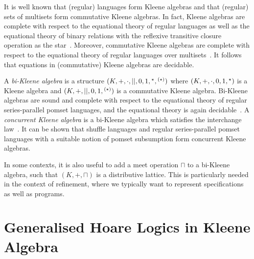 \documentclass{llncs}
\begin{document}
It is well known that (regular) languages form Kleene algebras and
that (regular) sets of multisets form commutative Kleene algebras. In
fact, Kleene algebras are complete with respect to the equational
theory of regular languages as well as the equational theory of binary
relations with the reflexive transitive closure operation as the
star~\cite{kozen_completeness_1994}. Moreover, commutative Kleene
algebras are complete with respect to the equational theory of regular
languages over multisets~\cite{conway_regular_1971}. It follows that
equations in (commutative) Kleene algebras are decidable.

A \emph{bi-Kleene algebra} is a structure
$(K,+,\cdot,||,0,1,\hphantom{}^\star,\hphantom{}^{(\star)})$ where
$(K,+,\cdot,0,1,\hphantom{}^\star)$ is a Kleene algebra and
$(K,+,||,0,1,\hphantom{}^{(\star)})$ is a commutative Kleene
algebra. Bi-Kleene algebras are sound and complete with respect to the
equational theory of regular series-parallel pomset languages, and the
equational theory is again decidable~\cite{laurence_completeness_2013}. A
\emph{concurrent Kleene algebra} is a bi-Kleene algebra which
satisfies the interchange law~\cite{hoare_concurrent_2011}. It can be shown that
shuffle languages and regular series-parallel pomset languages with a
suitable notion of pomset subsumption form concurrent Kleene algebras.

In some contexts, it is also useful to add a meet operation $\sqcap$ to a bi-Kleene algebra,
such that $(K,+,\sqcap)$ is a distributive lattice. This is
particularly needed in the context of refinement, where we typically
want to represent specifications as well as programs.


\section{Generalised Hoare Logics  in Kleene Algebra}
\end{document}
